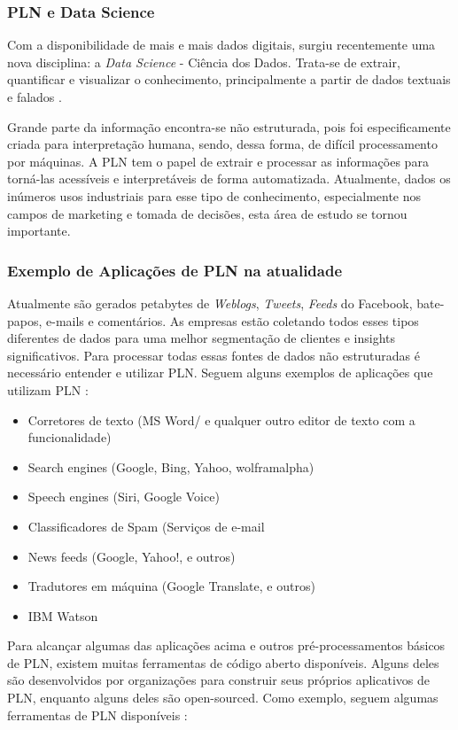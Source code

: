 \documentclass[
	12pt,				%
	openright,			%
	oneside,			%
	a4paper,			%
	english,			%
	spanish,			%
	brazil				%
	]{abntex2}
\begin{document}
	\subsubsection*{\gls{PLN} e Data Science}	
	Com a disponibilidade de mais e mais dados digitais, surgiu recentemente uma nova disciplina: a \emph{Data Science} - Ciência dos Dados. Trata-se de extrair, quantificar e visualizar o conhecimento, principalmente a partir de dados textuais e falados \cite{book_natural_lang}. 
	
	Grande parte da informação encontra-se não estruturada, pois foi especificamente criada para interpretação humana, sendo, dessa forma, de difícil processamento por máquinas. A \gls{PLN} tem o papel de extrair e processar as informações para torná-las acessíveis e interpretáveis de forma automatizada. Atualmente, dados os inúmeros usos industriais para esse tipo de conhecimento, especialmente nos campos de marketing e tomada de decisões, esta área de estudo se tornou importante.

	\subsubsection*{Exemplo de Aplicações de \gls{PLN} na atualidade}
	Atualmente são gerados petabytes de \emph{Weblogs}, \emph{Tweets}, \emph{Feeds} do Facebook, bate-papos, e-mails e comentários. As empresas estão coletando todos esses tipos diferentes de dados para uma melhor segmentação de clientes e insights significativos. Para processar todas essas fontes de dados não estruturadas é necessário entender e utilizar \gls{PLN}.
Seguem alguns exemplos de aplicações que utilizam \gls{PLN} \cite{book_natlang_python}:

	\begin{itemize}
	 	\item Corretores de texto (MS Word/ e qualquer outro editor de texto com a funcionalidade)
	 	\item Search engines (Google, Bing, Yahoo, wolframalpha)
	 	\item Speech engines (Siri, Google Voice)
	 	\item Classificadores de Spam (Serviços de e-mail
	 	\item News feeds (Google, Yahoo!, e outros)
	 	\item Tradutores em máquina (Google Translate, e outros)
	 	\item IBM Watson
	\end{itemize}

Para alcançar algumas das aplicações acima e outros pré-processamentos básicos de \gls{PLN}, existem muitas ferramentas de código aberto disponíveis. Alguns deles são desenvolvidos por organizações para construir seus próprios aplicativos de \gls{PLN}, enquanto alguns deles são open-sourced. Como exemplo, seguem algumas ferramentas de \gls{PLN} disponíveis \cite{book_natlang_python}:
\end{document}
